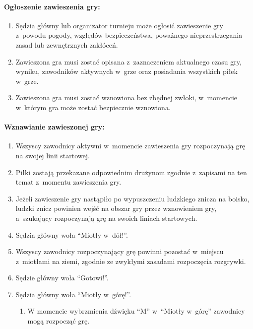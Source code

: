 \documentclass[12pt]{article}
\begin{document}
\paragraph{Ogłoszenie zawieszenia gry:}

\begin{enumerate}
	\item
	      Sędzia główny lub organizator turnieju może ogłosić zawieszenie gry z~powodu pogody, względów bezpieczeństwa, poważnego nieprzestrzegania
	      zasad lub zewnętrznych zakłóceń.
	\item
	      Zawieszona gra musi zostać opisana z~zaznaczeniem aktualnego czasu
	      gry, wyniku, zawodników aktywnych w~grze oraz posiadania wszystkich
	      piłek w~grze.
	\item
	      Zawieszona gra musi zostać wznowiona bez zbędnej zwłoki, w~momencie w~którym gra może zostać bezpiecznie wznowiona.
\end{enumerate}

\paragraph{Wznawianie zawieszonej gry:}

\begin{enumerate}
	\item
	      Wszyscy zawodnicy aktywni w~momencie zawieszenia gry rozpoczynają grę
	      na swojej linii startowej.
	\item
	      Piłki zostają przekazane odpowiednim drużynom zgodnie z~zapisami na
	      ten temat z~momentu zawieszenia gry.
	\item
	      Jeżeli zawieszenie gry nastąpiło po wypuszczeniu ludzkiego znicza na
	      boisko, ludzki znicz powinien wejść na obszar gry przez wznowieniem
	      gry, a~szukający rozpoczynają grę na swoich liniach startowych.
	\item
	      Sędzia główny woła ``Miotły w~dół!''.
	\item
	      Wszyscy zawodnicy rozpoczynający grę powinni pozostać w~miejscu z~miotłami na ziemi, zgodnie ze zwykłymi zasadami rozpoczęcia rozgrywki.
	\item
	      Sędzie główny woła ``Gotowi!''.
	\item
	      Sędzia główny woła ``Miotły w~górę!''.

	      \begin{enumerate}
		      \item
		            W momencie wybrzmienia dźwięku ``M'' w~``Miotły w~górę'' zawodnicy
		            mogą rozpocząć grę.
	      \end{enumerate}
\end{enumerate}
\end{document}
